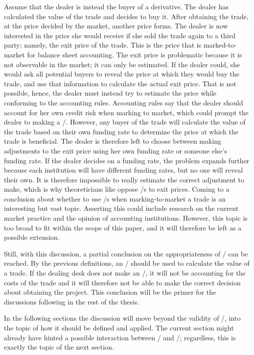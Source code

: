 \documentclass[main.tex]{subfiles}
\begin{document}
    Assume that the dealer is instead the buyer of a derivative.
    The dealer has calculated the value of the trade and decides to buy it.
    After obtaining the trade, at the price decided by the market, another price forms. 
    The dealer is now interested in the price she would receive 
    if she sold the trade again to a third party; namely, the exit price of the trade.
    This is the price that is marked-to-market for balance sheet accounting.
    The exit price is problematic because it is not observable in the market; 
    it can only be estimated.
    If the dealer could, she would ask all potential buyers to reveal the price 
    at which they would buy the trade, and use that information to calculate the actual exit price.
    That is not possible, hence, the dealer must instead try to estimate the price
    while conforming to the accounting rules.
    Accounting rules say that the dealer should account for her own credit risk 
    when marking to market, which could prompt the dealer to making a \DVA/.
    However, any buyer of the trade will calculate the value of the trade
    based on their own funding rate to determine the price at which the trade is beneficial.
    The dealer is therefore left to choose between making adjustments to the exit price
    using her own funding rate or someone else's funding rate.
    If the dealer decides on a funding rate, the problem expands further
    because each institution will have different funding rates, but no one will reveal their own.
    It is therefore impossible to really estimate the correct adjustment to make,
    which is why theoreticians like \textcite{HullWhite2012FVA} oppose \FVA/s to exit prices.
    Coming to a conclusion about whether to use \FVA/s when marking-to-market a trade
    is an interesting but vast topic.
    Asserting this could include research on the current market practice and
    the opinion of accounting institutions.
    However, this topic is too broad to fit within the scope of this paper,
    and it will therefore be left as a possible extension.

    Still, with this discussion, 
    a partial conclusion on the appropriateness of \FVA/ can be reached.
    By the previous definitions, an \FVA/ should be used to calculate the value of a trade.
    If the dealing desk does not make an \FVA/, it will not be accounting for the costs of the trade
    and it will therefore not be able to make the correct decision about obtaining the project.
    This conclusion will be the primer for the discussions following in the rest of the thesis.
    
    In the following sections the discussion will move beyond the validity of \FVA/,
    into the topic of how it should be defined and applied.
    The current section might already have hinted a possible interaction between \FVA/ and \DVA/;
    regardless, this is exactly the topic of the next section.
    
\end{document}
